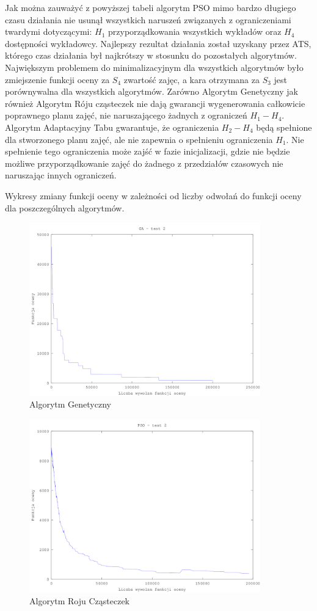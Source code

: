 Jak można zauważyć z powyższej tabeli algorytm PSO mimo bardzo długiego czasu działania nie usunął wszystkich naruszeń związanych z ograniczeniami twardymi dotyczącymi: ${H}_{1}$ przyporządkowania wszystkich wykładów oraz $H_{4}$ dostępności wykładowcy. Najlepszy rezultat działania został uzyskany przez ATS, którego czas działania był najkrótszy w stosunku do pozostałych algorytmów. Największym problemem do minimalizacyjnym dla wszystkich algorytmów było zmiejszenie funkcji oceny za $S_{4}$ zwartość zajęc, a kara otrzymana za $S_{3}$ jest porównywalna dla wszystkich algorytmów. 
Zarówno Algorytm Genetyczny jak również Algorytm Róju cząsteczek nie dają gwarancji wygenerowania całkowicie poprawnego planu zajęć, nie naruszającego żadnych z ograniczeń $H_{1}-H_{4}$. Algorytm Adaptacyjny Tabu gwarantuje, że ograniczenia $H_{2}-H_{4}$ będą spełnione dla stworzonego planu zajęć, ale nie zapewnia o spełnieniu ograniczenia ${H}_{1}$. Nie spełnienie tego ograniczenia może zajść w fazie inicjalizacji, gdzie nie będzie możliwe przyporządkowanie zajęć do żadnego z przedziałów czasowych nie naruszając innych ograniczeń.
\par  Wykresy zmiany funkcji oceny w zależności od liczby odwołań do funkcji oceny dla poszczególnych algorytmów.
\begin{figure}[H]
  \caption{Algorytm Genetyczny}
  \centering
    \includegraphics[width=10cm]{ga_test_2.png}
\end{figure}
\begin{figure}[H]
  \caption{Algorytm Roju Cząsteczek}
  \centering
    \includegraphics[width=10cm]{pso_2.png}
\end{figure}
